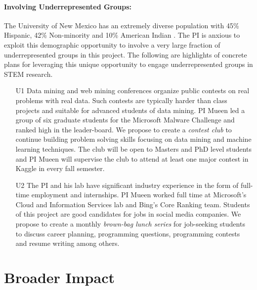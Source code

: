 \paragraph{Involving Underrepresented Groups:} The University of New Mexico has an extremely diverse population with 45\% Hispanic, 42\% Non-minority and 10\% American Indian \cite{UNMDiv}.
The PI is anxious to exploit this demographic opportunity to involve a very large fraction of underrepresented groups in this project. The following are highlights of concrete plans for leveraging this unique opportunity to engage underrepresented groups in STEM research.

\vspace{-0.3cm}
\begin{itemize}[noitemsep,leftmargin=*]


\item [U1] Data mining and web mining conferences organize public contests on real problems with real data. Such contests are typically harder than class projects and suitable for advanced students of data mining. PI Mueen led a group of six graduate students for the Microsoft Malware Challenge \cite{Malware} and ranked high in the leader-board. We propose to create a {\it contest club} to continue building problem solving skills focusing on data mining and machine learning techniques. The club will be open to Masters and PhD level students and PI Mueen will supervise the club to attend at least one major contest in Kaggle in every fall semester.


\item [U2] The PI and his lab have significant industry experience in the form of full-time employment and internships. PI Mueen worked full time at Microsoft's Cloud and Information Services lab and Bing's Core Ranking team. Students of this project are good candidates for jobs in social media companies. We propose to create a monthly {\it brown-bag lunch series} for job-seeking students to discuss career planning, programming questions, programming contests and resume writing among others. 
\end{itemize}


\section{Broader Impact} 

